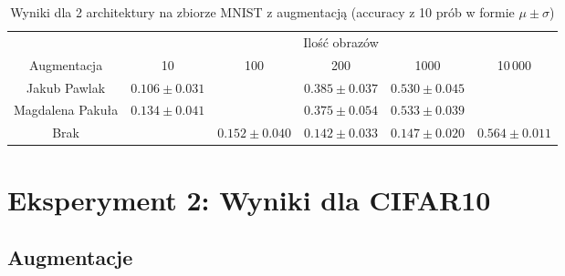 \documentclass[10pt]{article}
\begin{document}
\begin{table}[H]\centering
    \begin{tabular}{cccccc}
        \toprule
                         & \multicolumn{5}{c}{Ilość obrazów}                                                                                  \\ \cmidrule{2-6}
        Augmentacja      & 10                                & 100               & 200                & 1000              & 10\,000           \\ \midrule
        Jakub Pawlak     & $0.106 \pm 0.031 $                &                   & $0.385 \pm 0.037 $ & $0.530 \pm 0.045$                     \\
        Magdalena Pakuła & $0.134 \pm 0.041 $                &                   & $0.375 \pm 0.054 $ & $0.533 \pm 0.039$                     \\
        Brak             &                                   & $0.152 \pm 0.040$ & $0.142 \pm 0.033$  & $0.147 \pm 0.020$ & $0.564 \pm 0.011$ \\
        \bottomrule
    \end{tabular}
    \caption{Wyniki dla 2 architektury na zbiorze MNIST z augmentacją (accuracy z 10 prób w formie $\mu \pm \sigma$)}
\end{table}

\pagebreak
\section{Eksperyment 2: Wyniki dla CIFAR10}\label{sec:ex2_cifar}

\subsection*{Augmentacje}
\end{document}
